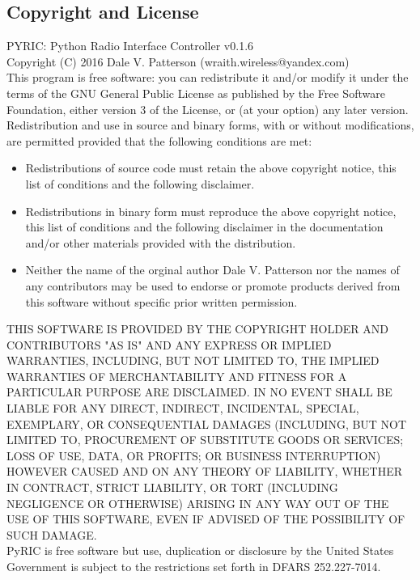 \documentclass[11pt]{article}
\begin{document}
\begin{appendices}
\section{Copyright and License}\label{sec:copy}
PYRIC: Python Radio Interface Controller v0.1.6\\

Copyright (C) 2016  Dale V. Patterson (wraith.wireless@yandex.com)\\

This program is free software: you can redistribute it and/or modify it under
the terms of the GNU General Public License\cite{gplv3} as published by the Free
Software Foundation, either version 3 of the License, or (at your option) any 
later version.\\

Redistribution and use in source and binary forms, with or without modifications,
are permitted provided that the following conditions are met:
\begin{itemize}
\item Redistributions of source code must retain the above copyright notice, this
list of conditions and the following disclaimer.
\item Redistributions in binary form must reproduce the above copyright notice,
this list of conditions and the following disclaimer in the documentation and/or 
other materials provided with the distribution.
\item Neither the name of the orginal author Dale V. Patterson nor the names of 
any contributors may be used to endorse or promote products derived from this 
software without specific prior written permission.
\end{itemize}

THIS SOFTWARE IS PROVIDED BY THE COPYRIGHT HOLDER AND CONTRIBUTORS "AS IS" AND
ANY EXPRESS OR IMPLIED WARRANTIES, INCLUDING, BUT NOT LIMITED TO, THE IMPLIED
WARRANTIES OF MERCHANTABILITY AND FITNESS FOR A PARTICULAR PURPOSE ARE DISCLAIMED.
IN NO EVENT SHALL BE LIABLE FOR ANY DIRECT, INDIRECT, INCIDENTAL, SPECIAL,
EXEMPLARY, OR CONSEQUENTIAL DAMAGES (INCLUDING, BUT NOT LIMITED TO, PROCUREMENT
OF SUBSTITUTE GOODS OR SERVICES; LOSS OF USE, DATA, OR PROFITS; OR BUSINESS
INTERRUPTION) HOWEVER CAUSED AND ON ANY THEORY OF LIABILITY, WHETHER IN CONTRACT,
STRICT LIABILITY, OR TORT (INCLUDING NEGLIGENCE OR OTHERWISE) ARISING IN ANY WAY
OUT OF THE USE OF THIS SOFTWARE, EVEN IF ADVISED OF THE POSSIBILITY OF SUCH DAMAGE.\\

PyRIC is free software but use, duplication or disclosure by the United States
Government is subject to the restrictions set forth in DFARS 252.227-7014.\\


\end{appendices}
\end{document}
